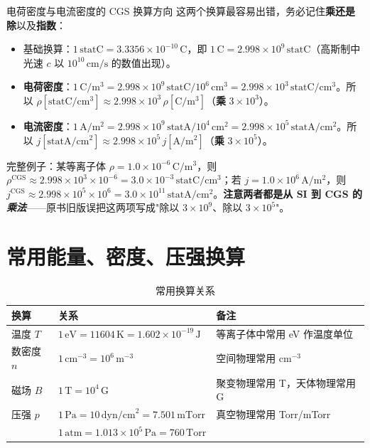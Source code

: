 \documentclass[12pt,a4paper,openany,oneside]{book}
\begin{document}
\begin{warning}{电荷密度与电流密度的 CGS 换算方向}{}
这两个换算最容易出错，务必记住\textbf{乘还是除}以及\textbf{指数}：
\begin{itemize}
    \item 基础换算：$1\,\mathrm{statC} = 3.3356\times 10^{-10}\,\mathrm{C}$，即 $1\,\mathrm{C} = 2.998\times 10^{9}\,\mathrm{statC}$（高斯制中光速 $c$ 以 $10^{10}\,\mathrm{cm/s}$ 的数值出现）。
    \item \textbf{电荷密度}：$1\,\mathrm{C/m^3} = 2.998\times10^{9}\,\mathrm{statC}/10^{6}\,\mathrm{cm^3} = 2.998\times10^{3}\,\mathrm{statC/cm^3}$。所以 $\rho[\mathrm{statC/cm^3}] \approx 2.998\times10^{3}\,\rho[\mathrm{C/m^3}]$（\textbf{乘} $3\times10^{3}$）。
    \item \textbf{电流密度}：$1\,\mathrm{A/m^2} = 2.998\times10^{9}\,\mathrm{statA}/10^{4}\,\mathrm{cm^2} = 2.998\times10^{5}\,\mathrm{statA/cm^2}$。所以 $j[\mathrm{statA/cm^2}] \approx 2.998\times10^{5}\,j[\mathrm{A/m^2}]$（\textbf{乘} $3\times10^{5}$）。
\end{itemize}
完整例子：某等离子体 $\rho = 1.0\times10^{-6}\,\mathrm{C/m^3}$，则 $\rho^\text{CGS} \approx 2.998\times10^{3}\times10^{-6} = 3.0\times10^{-3}\,\mathrm{statC/cm^3}$；若 $j = 1.0\times10^{6}\,\mathrm{A/m^2}$，则 $j^\text{CGS}\approx 2.998\times10^{5}\times10^{6} = 3.0\times10^{11}\,\mathrm{statA/cm^2}$。\textbf{注意两者都是从 SI 到 CGS 的\emph{乘法}}——原书旧版误把这两项写成"除以 $3\times10^9$、除以 $3\times10^5$"。
\end{warning}


\section{常用能量、密度、压强换算}

\begin{table}[htbp]
\centering
\caption{常用换算关系}
\label{tab:common-conversion}
\begin{tabular}{@{}lll@{}}
\toprule
\textbf{换算} & \textbf{关系} & \textbf{备注} \\
\midrule
温度 $T$ & $1\,\text{eV} = 11604\,\text{K} = 1.602\times 10^{-19}\,\text{J}$ & 等离子体中常用 eV 作温度单位 \\
数密度 $n$ & $1\,\text{cm}^{-3} = 10^6\,\text{m}^{-3}$ & 空间物理常用 cm$^{-3}$ \\
磁场 $B$ & $1\,\text{T} = 10^4\,\text{G}$ & 聚变物理常用 T，天体物理常用 G \\
压强 $p$ & $1\,\text{Pa} = 10\,\text{dyn/cm}^2 = 7.501\,\text{mTorr}$ & 真空物理常用 Torr/mTorr \\
& $1\,\text{atm} = 1.013\times 10^5\,\text{Pa} = 760\,\text{Torr}$ & \\
\bottomrule
\end{tabular}
\end{table}
\end{document}
